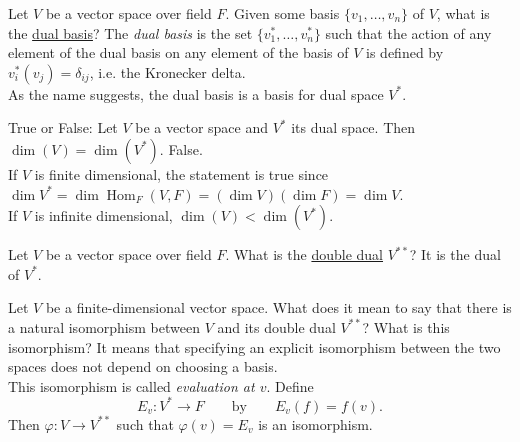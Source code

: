 \documentclass[avery5371,grid]{flashcards}
\DeclareMathOperator{\Hom}{Hom}
\let \phi \varphi
\begin{document}
\begin{flashcard}{Let $V$ be a vector space over field $F$. Given some basis $\{v_1, \ldots, v_n \}$ of $V$, what is the \underline{dual basis}?}
 The \emph{dual basis} is the set $\{v_1^*, \ldots, v_n^*\}$ such that the action of any element of the dual basis on any element of the basis of $V$ is defined by $v_i^*(v_j) = \delta_{ij}$, i.e. the Kronecker delta.\\
 
 As the name suggests, the dual basis is a basis for dual space $V^*$.
\end{flashcard}

\begin{flashcard}{True or False: Let $V$ be a vector space and $V^*$ its dual space. Then $\dim(V) = \dim(V^*)$.}
 False. \\
 
 If $V$ is finite dimensional, the statement is true since $\dim V^* = \dim \Hom_F(V,F) = (\dim V)(\dim F) = \dim V$. \\
 
If $V$ is infinite dimensional, $\dim(V) < \dim(V^*)$.
\end{flashcard}

\begin{flashcard}{Let $V$ be a vector space over field $F$. What is the \underline{double dual} $V^{**}$?}
 It is the dual of $V^*$.
\end{flashcard}

\begin{flashcard}{Let $V$ be a finite-dimensional vector space. What does it mean to say that there is a natural isomorphism between $V$ and its double dual $V^{**}$? What is this isomorphism?}
 It means that specifying an explicit isomorphism between the two spaces does not depend on choosing a basis.\\
 
 This isomorphism is called \emph{evaluation at $v$}. Define
 $$
 E_v: V^* \to F \qquad \text{by} \qquad E_v(f) = f(v).
 $$
 Then $\phi: V \to V^{**}$ such that $\phi(v) = E_v$ is an isomorphism.
\end{flashcard}
\end{document}
